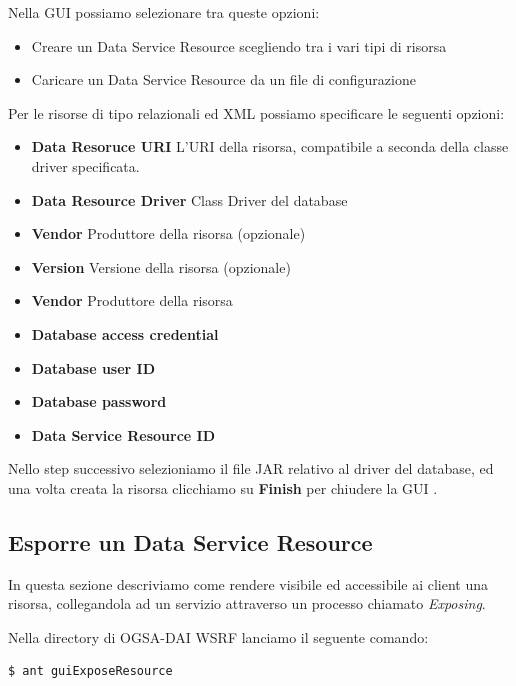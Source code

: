 \documentclass[11pt]{article}
\begin{document}
Nella GUI possiamo selezionare tra queste opzioni: 
\begin{itemize}
	\item Creare un Data Service Resource scegliendo tra i vari tipi di risorsa
	\item Caricare un Data Service Resource da un file di configurazione
\end{itemize}
Per le risorse di tipo relazionali ed XML possiamo specificare le seguenti opzioni: 
\begin{itemize}
	\item \textbf{Data Resoruce URI} L'URI della risorsa, compatibile a seconda della classe driver specificata. 
	\item \textbf{Data Resource Driver} Class Driver del database
	\item \textbf{Vendor} Produttore della risorsa (opzionale)
	\item \textbf{Version} Versione della risorsa (opzionale)
	\item \textbf{Vendor} Produttore della risorsa
	\item \textbf{Database access credential} 
	\item \textbf{Database user ID} 
	\item \textbf{Database password} 
	\item \textbf{Data Service Resource ID}
\end{itemize}
Nello step successivo selezioniamo il file JAR relativo al driver del database, ed una volta creata la risorsa clicchiamo su \textbf{Finish} per chiudere la GUI \cite{ogsadai}.

\subsection{Esporre un Data Service Resource}

In questa sezione descriviamo come rendere visibile ed accessibile ai client una risorsa, collegandola ad un servizio attraverso un processo chiamato \emph{Exposing}. 

Nella directory di OGSA-DAI WSRF lanciamo il seguente comando: 

\begin{lstlisting}[language=bash]
$ ant guiExposeResource
\end{lstlisting}
\end{document}
